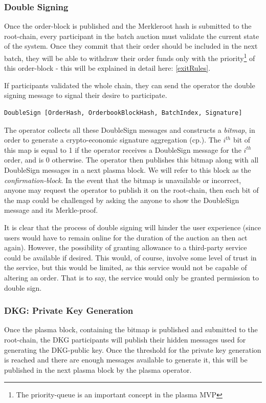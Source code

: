 \documentclass[11pt,parskip=full]{scrartcl}%
\begin{document}
\subsubsection{Double Signing}
Once the order-block is published and the Merkleroot hash is submitted to the root-chain, every participant in the batch auction must validate the current state of the system. 
Once they commit that their order should be included in the next batch, they will be able to withdraw their order funds only with the priority\footnote{The priority-queue is an important concept in the plasma MVP} of this order-block - this will be explained in detail here: \ref{exitRules}.

If participants validated the whole chain, they can send the operator the double signing message to signal their desire to participate. 
\begin{verbatim}
DoubleSign [OrderHash, OrderbookBlockHash, BatchIndex, Signature]
\end{verbatim}

The operator collects all these DoubleSign messages and constructs a \emph{bitmap}, in order to generate a crypto-economic signature aggregation (cp.\cite{sig}). 
The $i^{th}$ bit of this map is equal to 1 if the operator receives a DoubleSign message for the $i^{th}$ order, and is 0 otherwise.
The operator then publishes this bitmap along with all DoubleSign messages in a next plasma block. We will refer to this block as the \emph{confirmation-block}.\newline
In the event that the bitmap is unavailable or incorrect, anyone may request the operator to publish it on the root-chain, then each bit of the map could be challenged by asking the anyone to show the DoubleSign message and its Merkle-proof. 


It is clear that the process of double signing will hinder the user experience (since users would have to remain online for the duration of the auction an then act again). 
However, the possibility of granting allowance to a third-party service could be available if desired.
This would, of course, involve some level of trust in the service, but this would be limited, as this service would not be capable of altering an order. That is to say, the service would only be granted permission to double sign.

\subsubsection{DKG: Private Key Generation}
Once the plasma block, containing the bitmap is published and submitted to the root-chain, the DKG participants will publish their hidden messages used for generating the DKG-public key. 
Once the threshold for the private key generation is reached and there are enough messages available to generate it, this will be published in the next plasma block by the plasma operator. 
\end{document}
